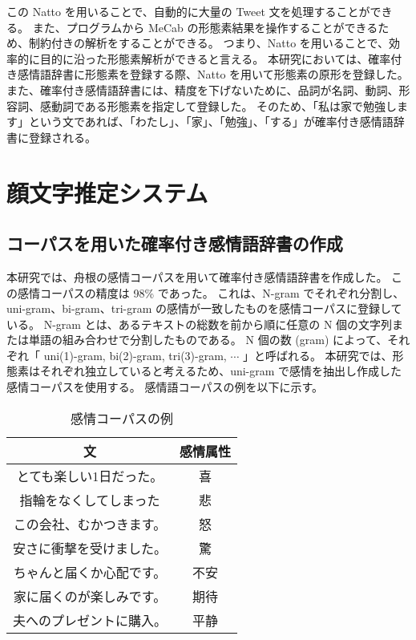 \documentclass[11pt,a4j]{jsarticle}
\begin{document}
この Natto を用いることで、自動的に大量の Tweet 文を処理することができる。
また、プログラムから MeCab の形態素結果を操作することができるため、制約付きの解析をすることができる。
つまり、Natto を用いることで、効率的に目的に沿った形態素解析ができると言える。
本研究においては、確率付き感情語辞書に形態素を登録する際、Natto を用いて形態素の原形を登録した。
また、確率付き感情語辞書には、精度を下げないために、品詞が名詞、動詞、形容詞、感動詞である形態素を指定して登録した。
そのため、「私は家で勉強します」という文であれば、「わたし」、「家」、「勉強」、「する」が確率付き感情語辞書に登録される。


\section{顔文字推定システム}\label{sec:theorem}
  \subsection{コーパスを用いた確率付き感情語辞書の作成}\label{sec:tweetcorpus}
本研究では、舟根の感情コーパスを用いて確率付き感情語辞書を作成した。
この感情コーパスの精度は 98\% であった。
これは、N-gram でそれぞれ分割し、uni-gram、bi-gram、tri-gram の感情が一致したものを感情コーパスに登録している。
N-gram とは、あるテキストの総数を前から順に任意の N 個の文字列または単語の組み合わせで分割したものである。
N 個の数 (gram) によって、それぞれ「 uni(1)-gram, bi(2)-gram, tri(3)-gram, $\cdots$ 」と呼ばれる。
本研究では、形態素はそれぞれ独立していると考えるため、uni-gram で感情を抽出し作成した感情コーパスを使用する。
感情語コーパスの例を以下に示す。

\begin{table}[htb]
  \caption{感情コーパスの例}
  \centering
  \begin{tabular}{c|c} \hline
    文 & 感情属性 \\ \hline \hline
    とても楽しい1日だった。 & 喜 \\
    指輪をなくしてしまった & 悲 \\
    この会社、むかつきます。 & 怒 \\ 
    安さに衝撃を受けました。 & 驚 \\
    ちゃんと届くか心配です。 & 不安 \\
    家に届くのが楽しみです。 & 期待 \\
    夫へのプレゼントに購入。& 平静 \\ \hline
  \end{tabular}
\end{table}
\end{document}
